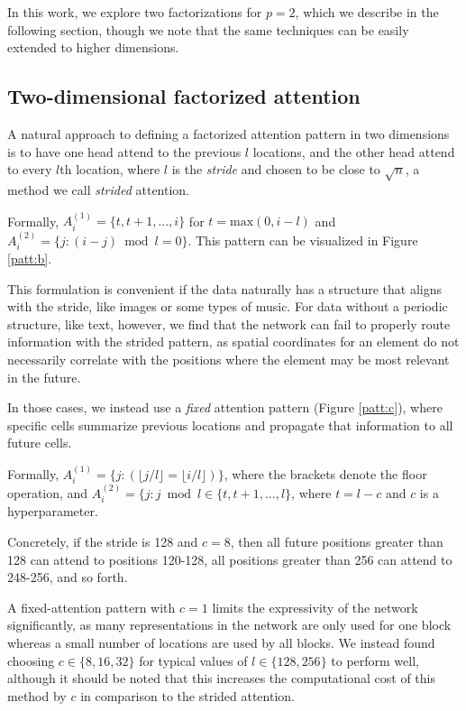 In this work, we explore two factorizations for $p=2$, which we describe in the following section, though we note that the same techniques can be easily extended to higher dimensions.

\subsection{Two-dimensional factorized attention} A natural approach to defining a factorized attention pattern in two dimensions is to have one head attend to the previous $l$ locations, and the other head attend to every $l$th location, where $l$ is the \textit{stride} and chosen to be close to $\sqrt{n}$, a method we call \textit{strided} attention. 

Formally, $A_{i}^{(1)} = \{t, t+1, ..., i \}$ for $t = \mathrm{max}(0, i-l)$ and $A_{i}^{(2)} = \{j : (i - j) \bmod l = 0 \}$. This pattern can be visualized in Figure \ref{patt:b}.

This formulation is convenient if the data naturally has a structure that aligns with the stride, like images or some types of music. For data without a periodic structure, like text, however, we find that the network can fail to properly route information with the strided pattern, as spatial coordinates for an element do not necessarily correlate with the positions where the element may be most relevant in the future.

In those cases, we instead use a \textit{fixed} attention pattern (Figure \ref{patt:c}), where specific cells summarize previous locations and propagate that information to all future cells.

Formally, $A_{i}^{(1)} = \{j : (\lfloor j / l \rfloor = \lfloor i / l \rfloor)\} $, where the brackets denote the floor operation, and $A_{i}^{(2)} = \{j : j \bmod l \in \{t, t + 1, ..., l \}$, where $t = l - c$ and $c$ is a hyperparameter. 

Concretely, if the stride is 128 and $c = 8$, then all future positions greater than 128 can attend to positions 120-128, all positions greater than 256 can attend to 248-256, and so forth.

A fixed-attention pattern with $c = 1$ limits the expressivity of the network significantly, as many representations in the network are only used for one block whereas a small number of locations are used by all blocks. We instead found choosing $c \in \{8, 16, 32\}$ for typical values of $l \in \{128, 256\}$ to perform well, although it should be noted that this increases the computational cost of this method by $c$ in comparison to the strided attention.

